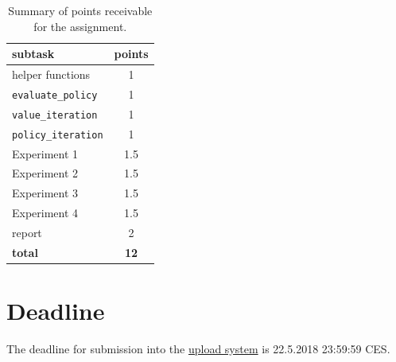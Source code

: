 \documentclass[10pt,journal,compsoc,twoside]{IEEEtran}
\begin{document}
\begin{table}[h]
\centering
 \begin{tabular}{l c} 
    subtask & points \\ 
    \hline
    helper functions & 1 \\
    {\lstinline|evaluate_policy|} & 1\\
    {\lstinline|value_iteration|} & 1 \\
    {\lstinline|policy_iteration|} & 1 \\
    \hline
    Experiment 1 & 1.5 \\ 
    Experiment 2 & 1.5 \\ 
    Experiment 3 & 1.5 \\ 
    Experiment 4 & 1.5 \\ 
    \hline
    report & 2 \\ \hline \hline
    \textbf{total} & \textbf{12}\\
    \hline
 \end{tabular}
 \caption{Summary of points receivable for the assignment.}
 \label{tab:grading}
\end{table}

\section{Deadline}
The deadline for submission into the \href{https://cw.felk.cvut.cz/brute/student/}{upload system} is 22.5.2018 23:59:59 CES.
\printbibliography





%
\end{document}

